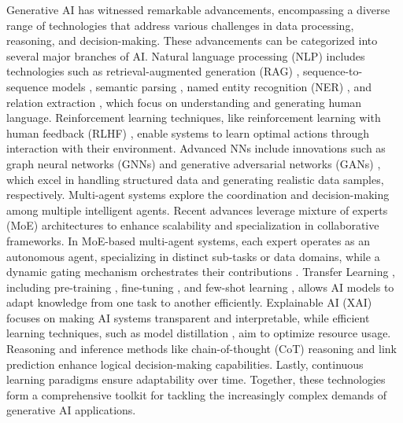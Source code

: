 \documentclass[12pt]{article}
\begin{document}
\vspace*{0.5cm}

Generative AI has witnessed remarkable advancements, encompassing a diverse range of technologies that address various challenges in data processing, reasoning, and decision-making. These advancements can be categorized into several major branches of AI. Natural language processing (NLP) \cite{vaswani2017attention} includes technologies such as retrieval-augmented generation (RAG) \cite{lewis2020retrieval}, sequence-to-sequence models \cite{sutskever2014sequence}, semantic parsing \cite{jiang2024survey}, named entity recognition (NER) \cite{marrero2013named}, and relation extraction \cite{zhao2024comprehensive}, which focus on understanding and generating human language. Reinforcement learning techniques, like reinforcement learning with human feedback (RLHF) \cite{christiano2017deep}, enable systems to learn optimal actions through interaction with their environment. Advanced NNs include innovations such as graph neural networks (GNNs) \cite{zhou2020graph} and generative adversarial networks (GANs) \cite{goodfellow2014generative}, which excel in handling structured data and generating realistic data samples, respectively. Multi-agent systems \cite{guo2024large, maldonado2024multi} explore the coordination and decision-making among multiple intelligent agents. Recent advances leverage mixture of experts (MoE) architectures to enhance scalability and specialization in collaborative frameworks. In MoE-based multi-agent systems, each expert operates as an autonomous agent, specializing in distinct sub-tasks or data domains, while a dynamic gating mechanism orchestrates their contributions \cite{he2024mixturemillionexperts, lo2024closerlookmixtureofexpertslarge}. Transfer Learning \cite{alyafeai2020survey}, including pre-training \cite{devlin2018bert}, fine-tuning \cite{howard2018universal}, and few-shot learning \cite{parnami2022learning}, allows AI models to adapt knowledge from one task to another efficiently. Explainable AI (XAI) \cite{arrieta2020explainable} focuses on making AI systems transparent and interpretable, while efficient learning techniques, such as model distillation \cite{hinton2015distilling}, aim to optimize resource usage. Reasoning and inference methods like chain-of-thought (CoT) \cite{wei2022chain} reasoning and link prediction enhance logical decision-making capabilities. Lastly, continuous learning \cite{chen2018lifelong} paradigms ensure adaptability over time. Together, these technologies form a comprehensive toolkit for tackling the increasingly complex demands of generative AI applications.
\end{document}

